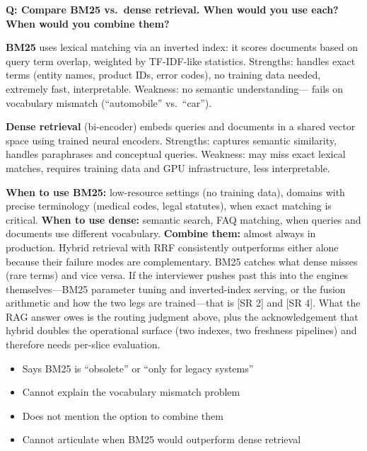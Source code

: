\begin{interviewq}
\textbf{Q: Compare BM25 vs.\ dense retrieval. When would you use each? When
would you combine them?}

 \quad {} \quad \badgefreq{\freqhigh}

\stronganswer
\textbf{BM25} uses lexical matching via an inverted index: it scores documents
based on query term overlap, weighted by TF-IDF-like statistics.  Strengths:
handles exact terms (entity names, product IDs, error codes), no training data
needed, extremely fast, interpretable.  Weakness: no semantic understanding---
fails on vocabulary mismatch (``automobile'' vs.\ ``car'').

\textbf{Dense retrieval} (bi-encoder) embeds queries and documents in a shared
vector space using trained neural encoders.  Strengths: captures semantic
similarity, handles paraphrases and conceptual queries.  Weakness: may miss
exact lexical matches, requires training data and GPU infrastructure, less
interpretable.

\textbf{When to use BM25:} low-resource settings (no training data), domains
with precise terminology (medical codes, legal statutes), when exact matching
is critical.  \textbf{When to use dense:} semantic search, FAQ matching, when
queries and documents use different vocabulary.  \textbf{Combine them:} almost
always in production.  Hybrid retrieval with RRF consistently outperforms
either alone because their failure modes are complementary.  BM25 catches
what dense misses (rare terms) and vice versa.  If the interviewer pushes past
this into the engines themselves---BM25 parameter tuning and inverted-index
serving, or the fusion arithmetic and how the two legs are trained---that is
[SR 2] and [SR 4].  What the RAG answer owes is the routing judgment above,
plus the acknowledgement that hybrid doubles the operational surface (two
indexes, two freshness pipelines) and therefore needs per-slice evaluation.

\redflags
\begin{itemize}
    \item Says BM25 is ``obsolete'' or ``only for legacy systems''
    \item Cannot explain the vocabulary mismatch problem
    \item Does not mention the option to combine them
    \item Cannot articulate when BM25 would outperform dense retrieval
\end{itemize}


\end{interviewq}

